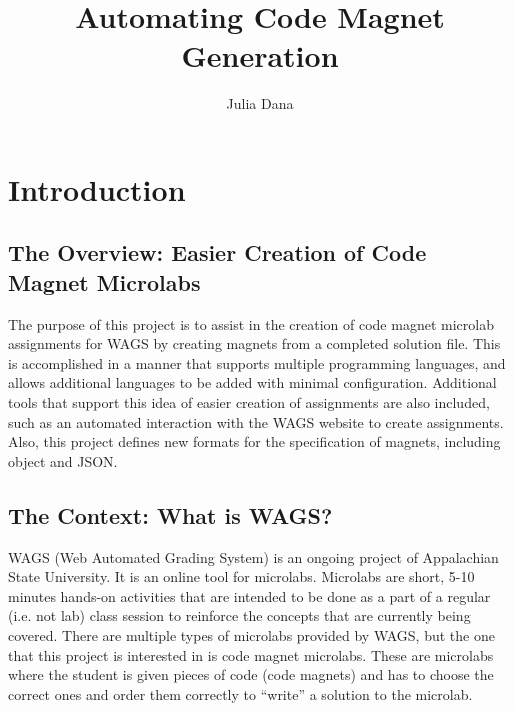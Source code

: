 \documentclass[letter,10pt]{article}
\title{Automating Code Magnet Generation}
\author{Julia Dana}
\date{}
\begin{document}
\maketitle


\pagebreak
\tableofcontents

\pagebreak

\section{Introduction}

\subsection{The Overview: Easier Creation of Code Magnet Microlabs}

The purpose of this project is to assist in the creation of code magnet 
microlab assignments for WAGS by creating magnets from a completed 
solution file. This is accomplished in a manner that supports multiple 
programming languages, and allows additional languages to be added with 
minimal configuration. Additional tools that support this idea of 
easier creation of assignments are also included, such as an automated
interaction with the WAGS website to create assignments. Also, this 
project defines new formats for the specification of magnets, including 
object and JSON. 

\subsection{The Context: What is WAGS?}

WAGS (Web Automated Grading System) is an ongoing project of 
Appalachian State University. It is an online tool for microlabs. 
Microlabs are short, 5-10 minutes hands-on activities that are 
intended to be done as a part of a regular (i.e. not lab) class session 
to reinforce the concepts that are currently being covered. There 
are multiple types of microlabs provided by WAGS, but the one that 
this project is interested in is code magnet microlabs. These are 
microlabs where the student is given pieces of code (code magnets) and 
has to choose the correct ones and order them correctly to “write” a 
solution to the microlab.

~
\end{document}

